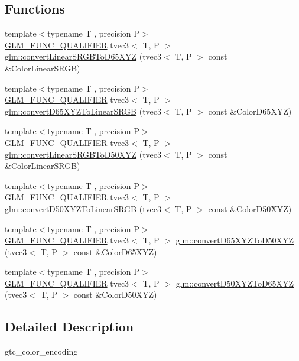 \subsection*{Functions}
\begin{DoxyCompactItemize}
\item 
{\footnotesize template$<$typename T , precision P$>$ }\\\mbox{\hyperlink{setup_8hpp_a33fdea6f91c5f834105f7415e2a64407}{G\+L\+M\+\_\+\+F\+U\+N\+C\+\_\+\+Q\+U\+A\+L\+I\+F\+I\+ER}} tvec3$<$ T, P $>$ \mbox{\hyperlink{namespaceglm_a8b469cdfa66e7369025674153e251f9c}{glm\+::convert\+Linear\+S\+R\+G\+B\+To\+D65\+X\+YZ}} (tvec3$<$ T, P $>$ const \&Color\+Linear\+S\+R\+GB)
\item 
{\footnotesize template$<$typename T , precision P$>$ }\\\mbox{\hyperlink{setup_8hpp_a33fdea6f91c5f834105f7415e2a64407}{G\+L\+M\+\_\+\+F\+U\+N\+C\+\_\+\+Q\+U\+A\+L\+I\+F\+I\+ER}} tvec3$<$ T, P $>$ \mbox{\hyperlink{namespaceglm_ac74f1b15a48f761a75eef73b66f5e00b}{glm\+::convert\+D65\+X\+Y\+Z\+To\+Linear\+S\+R\+GB}} (tvec3$<$ T, P $>$ const \&Color\+D65\+X\+YZ)
\item 
{\footnotesize template$<$typename T , precision P$>$ }\\\mbox{\hyperlink{setup_8hpp_a33fdea6f91c5f834105f7415e2a64407}{G\+L\+M\+\_\+\+F\+U\+N\+C\+\_\+\+Q\+U\+A\+L\+I\+F\+I\+ER}} tvec3$<$ T, P $>$ \mbox{\hyperlink{namespaceglm_acc3804c5ee87f8d40dc129daf339527a}{glm\+::convert\+Linear\+S\+R\+G\+B\+To\+D50\+X\+YZ}} (tvec3$<$ T, P $>$ const \&Color\+Linear\+S\+R\+GB)
\item 
{\footnotesize template$<$typename T , precision P$>$ }\\\mbox{\hyperlink{setup_8hpp_a33fdea6f91c5f834105f7415e2a64407}{G\+L\+M\+\_\+\+F\+U\+N\+C\+\_\+\+Q\+U\+A\+L\+I\+F\+I\+ER}} tvec3$<$ T, P $>$ \mbox{\hyperlink{namespaceglm_ab8956f6e96828d61823eafe5e2828ae5}{glm\+::convert\+D50\+X\+Y\+Z\+To\+Linear\+S\+R\+GB}} (tvec3$<$ T, P $>$ const \&Color\+D50\+X\+YZ)
\item 
{\footnotesize template$<$typename T , precision P$>$ }\\\mbox{\hyperlink{setup_8hpp_a33fdea6f91c5f834105f7415e2a64407}{G\+L\+M\+\_\+\+F\+U\+N\+C\+\_\+\+Q\+U\+A\+L\+I\+F\+I\+ER}} tvec3$<$ T, P $>$ \mbox{\hyperlink{namespaceglm_a58b0d0d80388abf226e864b15d1d49e9}{glm\+::convert\+D65\+X\+Y\+Z\+To\+D50\+X\+YZ}} (tvec3$<$ T, P $>$ const \&Color\+D65\+X\+YZ)
\item 
{\footnotesize template$<$typename T , precision P$>$ }\\\mbox{\hyperlink{setup_8hpp_a33fdea6f91c5f834105f7415e2a64407}{G\+L\+M\+\_\+\+F\+U\+N\+C\+\_\+\+Q\+U\+A\+L\+I\+F\+I\+ER}} tvec3$<$ T, P $>$ \mbox{\hyperlink{namespaceglm_abd0aba6ecc6ec9157139fccd985f188a}{glm\+::convert\+D50\+X\+Y\+Z\+To\+D65\+X\+YZ}} (tvec3$<$ T, P $>$ const \&Color\+D50\+X\+YZ)
\end{DoxyCompactItemize}


\subsection{Detailed Description}
gtc\+\_\+color\+\_\+encoding 